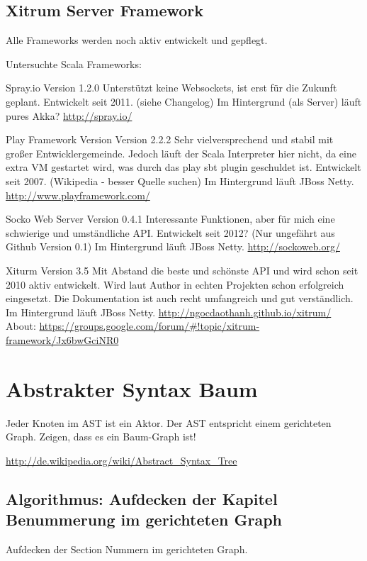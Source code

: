 \subsection{Xitrum Server Framework}

Alle Frameworks werden noch aktiv entwickelt und gepflegt.

Untersuchte Scala Frameworks:

Spray.io Version 1.2.0
Unterstützt keine Websockets, ist erst für die Zukunft geplant.
Entwickelt seit 2011. (siehe Changelog)
Im Hintergrund (als Server) läuft pures Akka?
\url{http://spray.io/}

Play Framework Version Version 2.2.2
Sehr vielversprechend und stabil mit großer Entwicklergemeinde.
Jedoch läuft der Scala Interpreter hier nicht, da eine extra VM gestartet
wird, was durch das play sbt plugin geschuldet ist.
Entwickelt seit 2007. (Wikipedia - besser Quelle suchen)
Im Hintergrund läuft JBoss Netty.
\url{http://www.playframework.com/}

Socko Web Server Version 0.4.1
Interessante Funktionen, aber für mich eine schwierige und umständliche API.
Entwickelt seit 2012? (Nur ungefährt aus Github Version 0.1)
Im Hintergrund läuft JBoss Netty.
\url{http://sockoweb.org/}

Xiturm Version 3.5
Mit Abstand die beste und schönste API und wird schon seit 2010 aktiv entwickelt.
Wird laut Author in echten Projekten schon erfolgreich eingesetzt.
Die Dokumentation ist auch recht umfangreich und gut verständlich.
Im Hintergrund läuft JBoss Netty.
\url{http://ngocdaothanh.github.io/xitrum/}
About: \url{https://groups.google.com/forum/#!topic/xitrum-framework/Jx6bwGciNR0}


\section{Abstrakter Syntax Baum}

Jeder Knoten im AST ist ein Aktor. Der AST entspricht einem gerichteten Graph.
Zeigen, dass es ein Baum-Graph ist!

\url{http://de.wikipedia.org/wiki/Abstract_Syntax_Tree}


\subsection{Algorithmus: Aufdecken der Kapitel Benummerung im gerichteten Graph}

Aufdecken der Section Nummern im gerichteten Graph.

